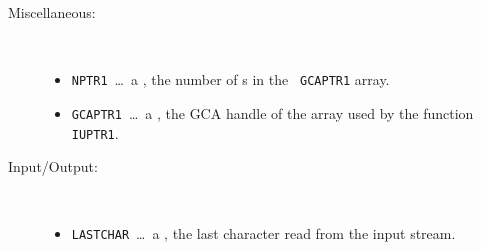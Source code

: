 \begin{description}
\item[Miscellaneous:] \ \
  \begin{itemize}
  \item {\tt NPTR1}\ \ldots\ a \Word, the number of \Word s in the {\tt
    GCAPTR1} array.
  \item {\tt GCAPTR1}\ \ldots\ a \Word, the GCA handle of the array used by
    the function {\tt IUPTR1}.
  \end{itemize}

\item[Input/Output:] \ \
  \begin{itemize}
  \item {\tt LASTCHAR}\ \ldots\ a \Word, the last character read from the
    input stream.
  \end{itemize}
\end{description}

